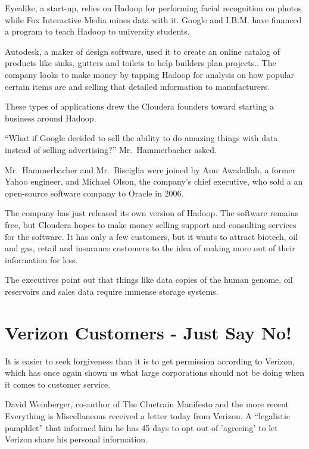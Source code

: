 \documentclass[12pt,a4paper,onecolumn]{article}
\begin{document}
\begin{CJK*}{GBK}{song}
Eyealike, a start-up, relies on Hadoop for performing facial recognition on photos while Fox
Interactive Media mines data with it. Google and I.B.M. have financed a program to teach Hadoop to
university students.

Autodesk, a maker of design software, used it to create an online catalog of products like sinks,
gutters and toilets to help builders plan projects.. The company looks to make money by tapping
Hadoop for analysis on how popular certain items are and selling that detailed information to
manufacturers.

These types of applications drew the Cloudera founders toward starting a business around Hadoop.

``What if Google decided to sell the ability to do amazing things with data instead of selling
advertising?'' Mr.~Hammerbacher asked.

Mr.~Hammerbacher and Mr.~Bisciglia were joined by Amr Awadallah, a former Yahoo engineer, and
Michael Olson, the company's chief executive, who sold a an open-source software company to Oracle
in 2006.

The company has just released its own version of Hadoop. The software remains free, but Cloudera
hopes to make money selling support and consulting services for the software. It has only a few
customers, but it wants to attract biotech, oil and gas, retail and insurance customers to the idea
of making more out of their information for less.

The executives point out that things like data copies of the human genome, oil reservoirs and sales
data require immense storage systems.

\section{Verizon Customers - Just Say No!}

It is easier to seek forgiveness than it is to get permission according to Verizon, which has once
again shown us what large corporations should not be doing when it comes to customer service.

David Weinberger, co-author of The Cluetrain Manifesto and the more recent Everything is
Miscellaneous received a letter today from Verizon. A ``legalistic pamphlet'' that informed him he
has 45 days to opt out of 'agreeing' to let Verizon share his personal information.


\end{CJK*}
\end{document}
